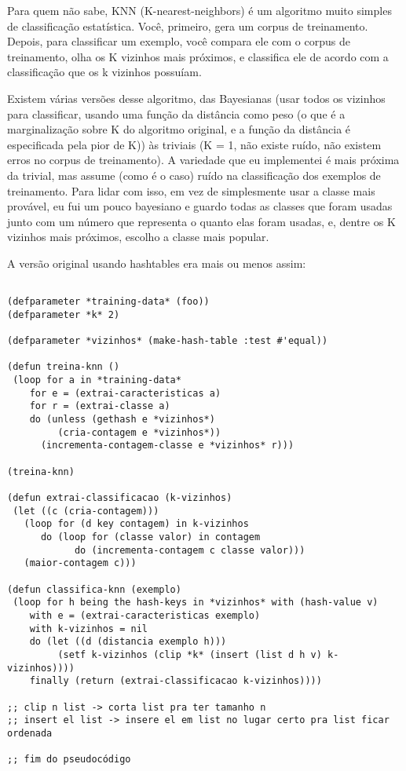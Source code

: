 \documentclass[12pt,brazil]{book}
\begin{document}
Para quem não sabe, KNN (K-nearest-neighbors) é um algoritmo muito
simples de classificação estatística. Você, primeiro, gera um corpus
de treinamento. Depois, para classificar um exemplo, você compara ele
com o corpus de treinamento, olha os K vizinhos mais próximos, e
classifica ele de acordo com a classificação que os k vizinhos
possuíam.

Existem várias versões desse algoritmo, das Bayesianas (usar todos os
vizinhos para classificar, usando uma função da distância como peso (o
que é a marginalização sobre K do algoritmo original, e a função da
distância é especificada pela pior de K)) às triviais (K = 1, não
existe ruído, não existem erros no corpus de treinamento). A variedade
que eu implementei é mais próxima da trivial, mas assume (como é o
caso) ruído na classificação dos exemplos de treinamento. Para lidar
com isso, em vez de simplesmente usar a classe mais provável, eu fui
um pouco bayesiano e guardo todas as classes que foram usadas junto
com um número que representa o quanto elas foram usadas, e, dentre os
K vizinhos mais próximos, escolho a classe mais popular.

A versão original usando hashtables era mais ou menos assim:

\begin{verbatim}

(defparameter *training-data* (foo))
(defparameter *k* 2)

(defparameter *vizinhos* (make-hash-table :test #'equal))

(defun treina-knn ()
 (loop for a in *training-data*
    for e = (extrai-caracteristicas a)
    for r = (extrai-classe a)
    do (unless (gethash e *vizinhos*)
         (cria-contagem e *vizinhos*))
      (incrementa-contagem-classe e *vizinhos* r)))

(treina-knn)

(defun extrai-classificacao (k-vizinhos)
 (let ((c (cria-contagem)))
   (loop for (d key contagem) in k-vizinhos
      do (loop for (classe valor) in contagem
            do (incrementa-contagem c classe valor)))
   (maior-contagem c)))

(defun classifica-knn (exemplo)
 (loop for h being the hash-keys in *vizinhos* with (hash-value v)
    with e = (extrai-caracteristicas exemplo)
    with k-vizinhos = nil
    do (let ((d (distancia exemplo h)))
         (setf k-vizinhos (clip *k* (insert (list d h v) k-vizinhos))))
    finally (return (extrai-classificacao k-vizinhos))))

;; clip n list -> corta list pra ter tamanho n
;; insert el list -> insere el em list no lugar certo pra list ficar ordenada

;; fim do pseudocódigo
\end{verbatim}
\end{document}
